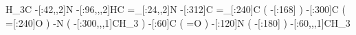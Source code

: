               H_3C%
     -[:42,,2]N%
    -[:96,,,2]HC%
    =_[:24,,2]N%
       -[:312]C%
      =_[:240]C%
                 (
           -[:168]\phantom{N}%
                 )
       -[:300]C%
                 (
           =[:240]O%
                 )
             -N%
                 (
       -[:300,,,1]CH_3%
                 )
        -[:60]C%
                 (
                 =O%
                 )
       -[:120]N%
                 (
           -[:180]\phantom{C}%
                 )
    -[:60,,,1]CH_3%